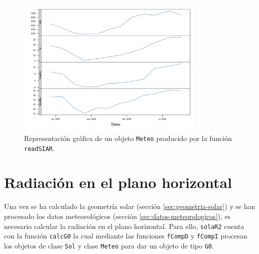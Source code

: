 \begin{figure}[!htb]
\centering
\includegraphics[width=0.8\textwidth]{figuras/codigo-readsiar.pdf}
\caption{Representación gráfica de un objeto \texttt{Meteo} producido por la función \texttt{readSIAR}.}
\end{figure}

\FloatBarrier

\section{Radiación en el plano horizontal}
\label{sec:orgef52519}
\label{sec:radiacion-plano-horizontal}
Una vez se ha calculado la geometría solar (sección \ref{sec:geometria-solar}) y se han procesado los datos meteorológicos (sección \ref{sec:datos-meteorologicos}), es necesario calcular la radiación en el plano horizontal. Para ello, \texttt{solaR2} cuenta con la función \texttt{calcG0} la cual mediante las funciones \texttt{fCompD} y \texttt{fCompI} procesan los objetos de clase \texttt{Sol} y clase \texttt{Meteo} para dar un objeto de tipo \texttt{G0}.

